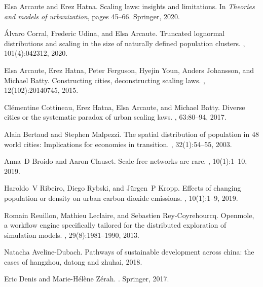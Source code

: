 \documentclass[11pt]{article}
\begin{document}
\begin{thebibliography}{10}
Elsa Arcaute and Erez Hatna.
\newblock Scaling laws: insights and limitations.
\newblock In {\em Theories and models of urbanization}, pages 45--66. Springer,
  2020.

{\'A}lvaro Corral, Frederic Udina, and Elsa Arcaute.
\newblock Truncated lognormal distributions and scaling in the size of
  naturally defined population clusters.
, 101(4):042312, 2020.

Elsa Arcaute, Erez Hatna, Peter Ferguson, Hyejin Youn, Anders Johansson, and
  Michael Batty.
\newblock Constructing cities, deconstructing scaling laws.
, 12(102):20140745, 2015.

Cl{\'e}mentine Cottineau, Erez Hatna, Elsa Arcaute, and Michael Batty.
\newblock Diverse cities or the systematic paradox of urban scaling laws.
, 63:80--94, 2017.

Alain Bertaud and Stephen Malpezzi.
\newblock The spatial distribution of population in 48 world cities:
  Implications for economies in transition.
, 32(1):54--55, 2003.

Anna~D Broido and Aaron Clauset.
\newblock Scale-free networks are rare.
, 10(1):1--10, 2019.

Haroldo~V Ribeiro, Diego Rybski, and J{\"u}rgen~P Kropp.
\newblock Effects of changing population or density on urban carbon dioxide
  emissions.
, 10(1):1--9, 2019.

Romain Reuillon, Mathieu Leclaire, and Sebastien Rey-Coyrehourcq.
\newblock Openmole, a workflow engine specifically tailored for the distributed
  exploration of simulation models.
, 29(8):1981--1990, 2013.

Natacha Aveline-Dubach.
\newblock Pathways of sustainable development across china: the cases of
  hangzhou, datong and zhuhai, 2018.

Eric Denis and Marie-H{\'e}l{\`e}ne Z{\'e}rah.
.
\newblock Springer, 2017.


\end{thebibliography}
\end{document}
